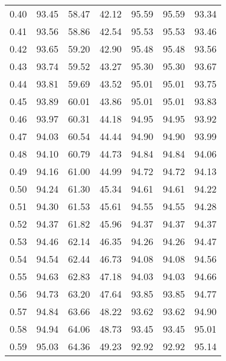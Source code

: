 \begin{tabular}{|c|c|c|c|c|c|c|}
      0.40 &     93.45 &     58.47 &      42.12 &   95.59 &      95.59 &         93.34 \\
      0.41 &     93.56 &     58.86 &      42.54 &   95.53 &      95.53 &         93.46 \\
      0.42 &     93.65 &     59.20 &      42.90 &   95.48 &      95.48 &         93.56 \\
      0.43 &     93.74 &     59.52 &      43.27 &   95.30 &      95.30 &         93.67 \\
      0.44 &     93.81 &     59.69 &      43.52 &   95.01 &      95.01 &         93.75 \\
      0.45 &     93.89 &     60.01 &      43.86 &   95.01 &      95.01 &         93.83 \\
      0.46 &     93.97 &     60.31 &      44.18 &   94.95 &      94.95 &         93.92 \\
      0.47 &     94.03 &     60.54 &      44.44 &   94.90 &      94.90 &         93.99 \\
      0.48 &     94.10 &     60.79 &      44.73 &   94.84 &      94.84 &         94.06 \\
      0.49 &     94.16 &     61.00 &      44.99 &   94.72 &      94.72 &         94.13 \\
      0.50 &     94.24 &     61.30 &      45.34 &   94.61 &      94.61 &         94.22 \\
      0.51 &     94.30 &     61.53 &      45.61 &   94.55 &      94.55 &         94.28 \\
      0.52 &     94.37 &     61.82 &      45.96 &   94.37 &      94.37 &         94.37 \\
      0.53 &     94.46 &     62.14 &      46.35 &   94.26 &      94.26 &         94.47 \\
      0.54 &     94.54 &     62.44 &      46.73 &   94.08 &      94.08 &         94.56 \\
      0.55 &     94.63 &     62.83 &      47.18 &   94.03 &      94.03 &         94.66 \\
      0.56 &     94.73 &     63.20 &      47.64 &   93.85 &      93.85 &         94.77 \\
      0.57 &     94.84 &     63.66 &      48.22 &   93.62 &      93.62 &         94.90 \\
      0.58 &     94.94 &     64.06 &      48.73 &   93.45 &      93.45 &         95.01 \\
      0.59 &     95.03 &     64.36 &      49.23 &   92.92 &      92.92 &         95.14 \\

\end{tabular}

